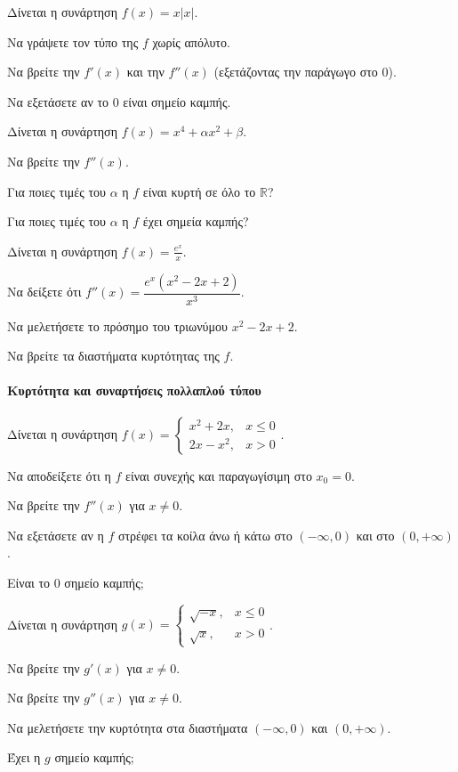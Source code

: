 \documentclass[11pt,a4paper,modern]{FFExercises}
\begin{document}
\askhsh
Δίνεται η συνάρτηση $f(x) = x|x|$.
\begin{alist}
    \item Να γράψετε τον τύπο της $f$ χωρίς απόλυτο.
    \item Να βρείτε την $f'(x)$ και την $f''(x)$ (εξετάζοντας την παράγωγο στο $0$).
    \item Να εξετάσετε αν το $0$ είναι σημείο καμπής.
\end{alist}

\askhsh
Δίνεται η συνάρτηση $f(x) = x^4 + \alpha x^2 + \beta$.
\begin{alist}
    \item Να βρείτε την $f''(x)$.
    \item Για ποιες τιμές του $\alpha$ η $f$ είναι κυρτή σε όλο το $\mathbb{R}$?
    \item Για ποιες τιμές του $\alpha$ η $f$ έχει σημεία καμπής?
\end{alist}

\askhsh
Δίνεται η συνάρτηση $f(x) = \frac{e^x}{x}$.
\begin{alist}
    \item Να δείξετε ότι $f''(x) = \dfrac{e^x(x^2-2x+2)}{x^3}$.
    \item Να μελετήσετε το πρόσημο του τριωνύμου $x^2-2x+2$.
    \item Να βρείτε τα διαστήματα κυρτότητας της $f$.
\end{alist}

\paragraph{Κυρτότητα και συναρτήσεις πολλαπλού τύπου}

\askhsh
Δίνεται η συνάρτηση $f(x) = \begin{cases} x^2+2x, & x \le 0 \\ 2x-x^2, & x > 0 \end{cases}$.
\begin{alist}
    \item Να αποδείξετε ότι η $f$ είναι συνεχής και παραγωγίσιμη στο $x_0=0$.
    \item Να βρείτε την $f''(x)$ για $x \ne 0$.
    \item Να εξετάσετε αν η $f$ στρέφει τα κοίλα άνω ή κάτω στο $(-\infty, 0)$ και στο $(0, +\infty)$.
    \item Είναι το $0$ σημείο καμπής;
\end{alist}

\askhsh
Δίνεται η συνάρτηση $g(x) = \begin{cases} \sqrt{-x}, & x \le 0 \\ \sqrt{x}, & x > 0 \end{cases}$.
\begin{alist}
    \item Να βρείτε την $g'(x)$ για $x \ne 0$.
    \item Να βρείτε την $g''(x)$ για $x \ne 0$.
    \item Να μελετήσετε την κυρτότητα στα διαστήματα $(-\infty, 0)$ και $(0, +\infty)$.
    \item Έχει η $g$ σημείο καμπής;
\end{alist}
\end{document}
